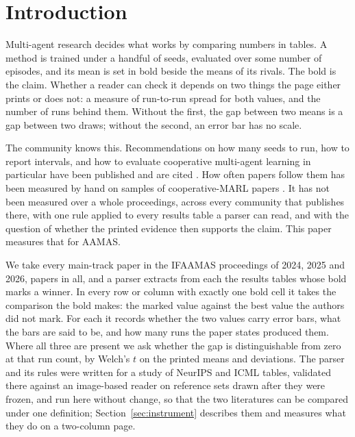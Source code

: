 \documentclass[sigconf,anonymous]{aamas}
\begin{document}
\section{Introduction}
\label{sec:intro}

Multi-agent research decides what works by comparing numbers in tables. A
method is trained under a handful of seeds, evaluated over some number of
episodes, and its mean is set in bold beside the means of its rivals. The bold
is the claim. Whether a reader can check it depends on two things the page
either prints or does not: a measure of run-to-run spread for both values, and
the number of runs behind them. Without the first, the gap between two means
is a gap between two draws; without the second, an error bar has no scale.

The community knows this. Recommendations on how many seeds to run, how to
report intervals, and how to evaluate cooperative multi-agent learning in
particular have been published and are cited
\cite{henderson2017deep,colas2018how,agarwal2021deep,gorsane2022towards,patterson2024empirical}.
How often papers follow them has been measured by hand on samples of
cooperative-MARL papers \cite{gorsane2022towards,singh2023how}. It has not
been measured over a whole proceedings, across every community that
publishes there, with one rule applied to every results table a parser can
read, and with the question of whether the printed evidence then supports
the claim. This paper measures that for AAMAS.

We take every main-track paper in the IFAAMAS proceedings of 2024, 2025 and
2026, \nAPapers{} papers in all, and a parser extracts from each the results
tables whose bold marks a winner. In every row or column with exactly one
bold cell it takes the comparison the bold makes: the marked value against
the best value the authors did not mark. For each it records whether the two
values carry error bars, what the bars are said to be, and how many runs the
paper states produced them. Where all three are present we ask whether the
gap is distinguishable from zero at that run count, by Welch's $t$ on the
printed means and deviations. The parser and its rules were written for a
study of NeurIPS and ICML tables, validated there against an image-based
reader on reference sets drawn after they were frozen, and run here without
change, so that the two literatures can be compared under one definition;
Section~\ref{sec:instrument} describes them and measures what they do on a
two-column page.
\end{document}
